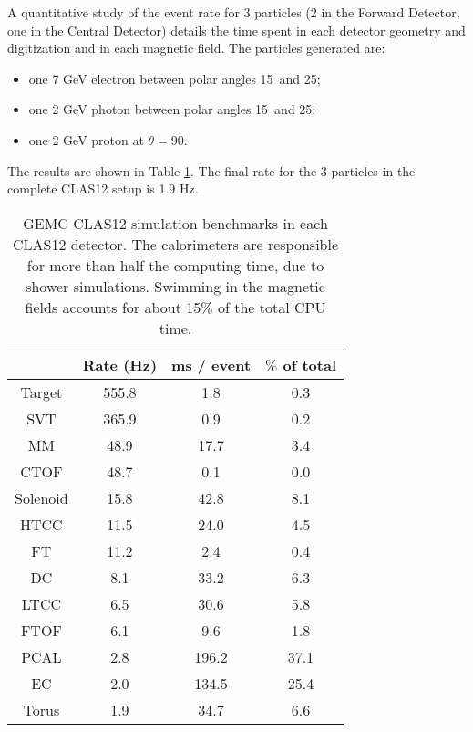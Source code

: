 A quantitative study of the event rate for 3 particles (2 in the Forward Detector, one in the Central Detector)
details the time spent in each detector geometry and digitization and in each magnetic field.
The particles generated are:

\begin{itemize}
	\item one 7 GeV electron between polar angles 15\mdeg \ and 25\mdeg;
	\item one 2 GeV photon between polar angles 15\mdeg \ and 25\mdeg;
	\item one 2 GeV proton at $\theta=$90\mdeg.
\end{itemize}

The results are shown in Table \ref{tab:benchmarks}. The final rate for the 3 particles in the
complete CLAS12 setup is 1.9 Hz.

\begin{table}[h]
	\begin{center}
		\begin{tabular}{ c | c | c | c }
			 \hline \hline
			 & Rate (Hz) &  ms / event &  $\%$ of total\\
			\hline
Target   &  555.8  &   1.8   & 0.3  \\
SVT      &  365.9  &   0.9   & 0.2  \\
MM       &  48.9   &   17.7  & 3.4  \\
CTOF     &  48.7   &   0.1   & 0.0  \\
Solenoid &  15.8   &   42.8  & 8.1  \\
HTCC     &  11.5   &   24.0  & 4.5  \\
FT       &  11.2   &   2.4   & 0.4  \\
DC       &  8.1    &   33.2  & 6.3  \\
LTCC     &  6.5    &   30.6  & 5.8  \\
FTOF     &  6.1    &   9.6   & 1.8  \\
PCAL     &  2.8    &   196.2 & 37.1 \\
EC       &  2.0    &   134.5 & 25.4 \\
Torus    &  1.9    &   34.7  & 6.6  \\
		\hline \hline
		\end{tabular}
	\end{center}
	\caption{GEMC CLAS12 simulation benchmarks in each CLAS12 detector. The calorimeters are responsible for more than
             half the computing time, due to shower simulations. Swimming in the magnetic fields accounts for about 15$\%$ of the total CPU time.}
\label{tab:benchmarks}
\end{table}

